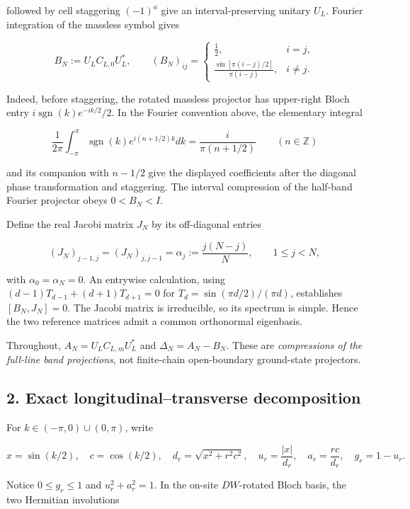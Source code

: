 \documentclass[
  10pt,
  a4paper,
]{article}
\begin{document}
followed by cell staggering \((-1)^a\) give an interval-preserving unitary \(U_L\). Fourier integration of the massless symbol gives

\[
 B_N:=U_LC_{L,0}U_L^*,\qquad
 (B_N)_{ij}=\begin{cases}
 \frac12,&i=j,\\
 \displaystyle\frac{\sin[\pi(i-j)/2]}{\pi(i-j)},&i\ne j.
 \end{cases}
\]

Indeed, before staggering, the rotated massless projector has upper-right Bloch entry \(i\operatorname{sgn}(k)e^{-ik/2}/2\). In the Fourier convention above, the elementary integral

\[
\frac1{2\pi}\int_{-\pi}^{\pi}\operatorname{sgn}(k)e^{i(n+1/2)k}dk
=\frac{i}{\pi(n+1/2)}\qquad(n\in\mathbb Z)
\]

and its companion with \(n-1/2\) give the displayed coefficients after the diagonal phase transformation and staggering. The interval compression of the half-band Fourier projector obeys \(0<B_N<I\).

Define the real Jacobi matrix \(J_N\) by its off-diagonal entries

\[
 (J_N)_{j-1,j}=(J_N)_{j,j-1}=\alpha_j:=\frac{j(N-j)}{N},
 \qquad 1\le j<N,
\]

with \(\alpha_0=\alpha_N=0\). An entrywise calculation, using \((d-1)T_{d-1}+(d+1)T_{d+1}=0\) for \(T_d=\sin(\pi d/2)/(\pi d)\), establishes \([B_N,J_N]=0\). The Jacobi matrix is irreducible, so its spectrum is simple. Hence the two reference matrices admit a common orthonormal eigenbasis.

Throughout, \(A_N=U_LC_{L,m}U_L^*\) and \(\Delta_N=A_N-B_N\). These are \emph{compressions of the full-line band projections}, not finite-chain open-boundary ground-state projectors.

\subsection{2. Exact longitudinal--transverse decomposition}\label{exact-longitudinaltransverse-decomposition}

For \(k\in(-\pi,0)\cup(0,\pi)\), write

\[
 x=\sin(k/2),\quad c=\cos(k/2),\quad
 d_r=\sqrt{x^2+r^2c^2},\quad
 u_r=\frac{|x|}{d_r},\quad a_r=\frac{rc}{d_r},\quad g_r=1-u_r.
\]

Notice \(0\le g_r\le1\) and \(u_r^2+a_r^2=1\). In the on-site \(DW\)-rotated Bloch basis, the two Hermitian involutions
\end{document}
